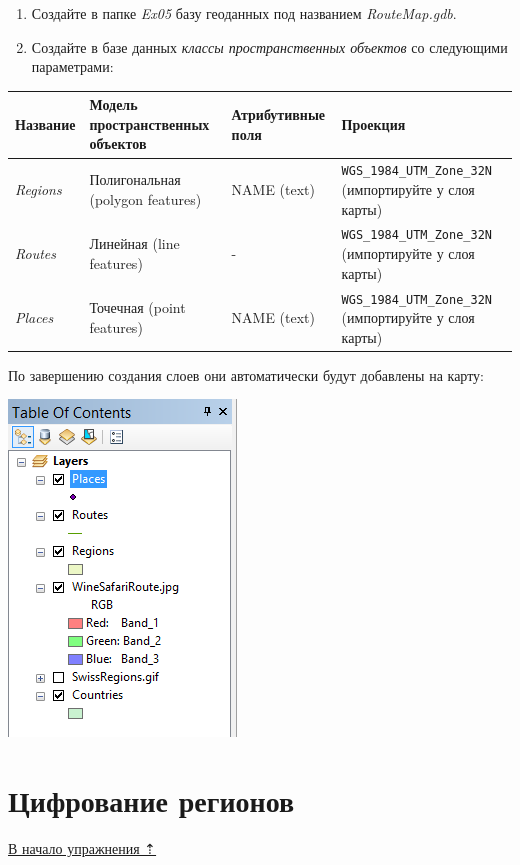 \documentclass[]{book}
\theoremstyle{definition}
\theoremstyle{definition}
\theoremstyle{definition}
\theoremstyle{remark}
\begin{document}
\begin{enumerate}
\def\labelenumi{\arabic{enumi}.}
\item
  Создайте в папке \emph{Ex05} базу геоданных под названием
  \emph{RouteMap.gdb}.
\item
  Создайте в базе данных \emph{классы пространственных объектов} со
  следующими параметрами:
\end{enumerate}

\begin{longtable}[]{@{}llll@{}}
\toprule
Название & Модель пространственных объектов & Атрибутивные поля &
Проекция\tabularnewline
\midrule
\endhead
\emph{Regions} & Полигональная (polygon features) & NAME (text) &
\texttt{WGS\_1984\_UTM\_Zone\_32N} (импортируйте у слоя
карты)\tabularnewline
\emph{Routes} & Линейная (line features) & - &
\texttt{WGS\_1984\_UTM\_Zone\_32N} (импортируйте у слоя
карты)\tabularnewline
\emph{Places} & Точечная (point features) & NAME (text) &
\texttt{WGS\_1984\_UTM\_Zone\_32N} (импортируйте у слоя
карты)\tabularnewline
\bottomrule
\end{longtable}

По завершению создания слоев они автоматически будут добавлены на карту:

\includegraphics{images/Ex05/image14.png}

\hypertarget{map-ref-general-digitizing}{%
\section{Цифрование регионов}\label{map-ref-general-digitizing}}

\protect\hyperlink{map-ref-general}{В начало упражнения ⇡}
\end{document}
